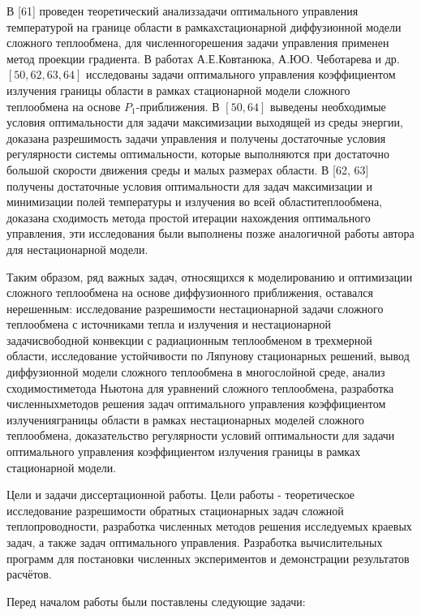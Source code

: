 \documentclass[10pt]{article}
\begin{document}
В [61] проведен теоретический анализзадачи оптимального управления температурой на границе области в рамкахстационарной диффузионной модели сложного теплообмена, для численногорешения задачи управления применен метод проекции градиента. В работах А.Е.Ковтанюка, А.ЮО. Чеботарева и др. $[50,62,63,64]$ исследованы задачи оптимального управления коэффициентом излучения границы области в рамках стационарной модели сложного теплообмена на основе $P_{1}$-приближения. В $[50,64]$ выведены необходимые условия оптимальности для задачи максимизации выходящей из среды энергии, доказана разрешимость задачи управления и получены достаточные условия регулярности системы оптимальности, которые выполняются при достаточно большой скорости движения среды и малых размерах области. В [62, 63] получены достаточные условия оптимальности для задач максимизации и минимизации полей температуры и излучения во всей областитеплообмена, доказана сходимость метода простой итерации нахождения оптимального управления, эти исследования были выполнены позже аналогичной работы автора для нестационарной модели.

Таким образом, ряд важных задач, относящихся к моделированию и оптимизации сложного теплообмена на основе диффузионного приближения, оставался нерешенным: исследование разрешимости нестационарной задачи сложного теплообмена с источниками тепла и излучения и нестационарной задачисвободной конвекции с радиационным теплообменом в трехмерной области, исследование устойчивости по Ляпунову стационарных решений, вывод диффузионной модели сложного теплообмена в многослойной среде, анализ сходимостиметода Ньютона для уравнений сложного теплообмена, разработка численныхметодов решения задач оптимального управления коэффициентом излученияграницы области в рамках нестационарных моделей сложного теплообмена, доказательство регулярности условий оптимальности для задачи оптимального управления коэффициентом излучения границы в рамках стационарной модели.

Цели и задачи диссертационной работы. Цели работы - теоретическое исследование разрешимости обратных стационарных задач сложной теплопроводности, разработка численных методов решения исследуемых краевых задач, а также задач оптимального управления. Разработка вычислительных программ для постановки численных экспериментов и демонстрации результатов расчётов.

Перед началом работы были поставлены следующие задачи:
\end{document}
